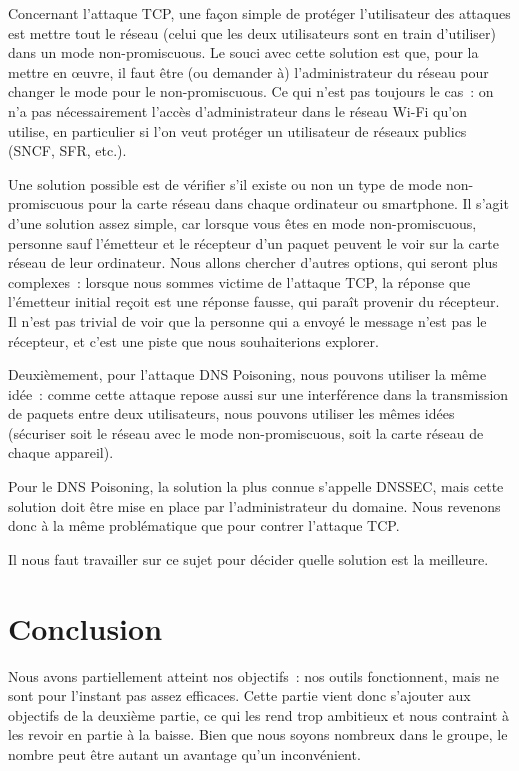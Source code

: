 \documentclass[a4paper, 12pt,twoside]{article}
\begin{document}
            Concernant l'attaque TCP, une façon simple de protéger l'utilisateur des attaques est mettre tout le réseau (celui que les deux utilisateurs sont en train d'utiliser) dans un mode non-promiscuous. Le souci avec cette solution est que, pour la mettre en \oe{}uvre, il faut être (ou demander à) l'administrateur du réseau pour changer le mode pour le non-promiscuous. Ce qui n'est pas toujours le cas~: on n'a pas nécessairement l'accès d'administrateur dans le réseau Wi-Fi qu'on utilise, en particulier si l'on veut protéger un utilisateur de réseaux publics (SNCF, SFR, etc.).

            Une solution possible est de vérifier s'il existe ou non un type de mode non-promiscuous pour la carte réseau dans chaque ordinateur ou smartphone. Il s'agit d'une solution assez simple, car lorsque vous êtes en mode non-promiscuous, personne sauf l'émetteur et le récepteur d'un paquet peuvent le voir sur la carte réseau de leur ordinateur. Nous allons chercher d'autres options, qui seront plus complexes~:  lorsque nous sommes victime de l'attaque TCP, la réponse que l'émetteur initial reçoit est une réponse fausse, qui paraît provenir du récepteur. Il n'est pas trivial de voir que la personne qui a envoyé le message n'est pas le récepteur, et c'est une piste que nous souhaiterions explorer.

            Deuxièmement, pour l'attaque DNS Poisoning, nous pouvons utiliser la même idée~: comme cette attaque repose aussi sur une interférence dans la transmission de paquets entre deux utilisateurs, nous pouvons utiliser les mêmes idées (sécuriser soit le réseau avec le mode non-promiscuous, soit la carte réseau de chaque appareil).

            Pour le DNS Poisoning, la solution la plus connue s'appelle DNSSEC, mais cette solution doit être mise en place par l'administrateur du domaine. Nous revenons donc à la même problématique que pour contrer l'attaque TCP.

            Il nous faut travailler sur ce sujet pour décider quelle solution est la meilleure.

    \clearpage
    \section*{Conclusion}

        Nous avons partiellement atteint nos objectifs~: nos outils fonctionnent, mais ne sont pour l'instant pas assez efficaces. Cette partie vient donc s'ajouter aux objectifs de la deuxième partie, ce qui les rend trop ambitieux et nous contraint à les revoir en partie à la baisse. Bien que nous soyons nombreux dans le groupe, le nombre peut être autant un avantage qu'un inconvénient.
\end{document}
